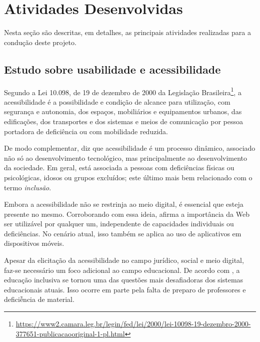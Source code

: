 \chapter{Atividades Desenvolvidas}\label{sec:ativ_desenvolvidas}
Nesta seção são descritas, em detalhes, as principais atividades realizadas para a condução deste projeto.


\section{Estudo sobre usabilidade e acessibilidade}\label{sec:estudos_usab_acess} 


Segundo a Lei 10.098, de 19 de dezembro de 2000 da Legislação Brasileira\footnote{\url{https://www2.camara.leg.br/legin/fed/lei/2000/lei-10098-19-dezembro-2000-377651-publicacaooriginal-1-pl.html}}, a acessibilidade é a possibilidade e condição de alcance para utilização, com segurança e autonomia, dos
espaços, mobiliários e equipamentos urbanos, das edificações, dos transportes e dos sistemas e meios de comunicação por pessoa portadora de deficiência ou com mobilidade reduzida. 

De modo complementar, \cite{torres2002acessibilidade} diz que acessibilidade é um processo dinâmico, associado não só ao desenvolvimento tecnológico, mas principalmente ao desenvolvimento da sociedade. Em geral, está associada a pessoas com deficiências físicas ou psicológicas, idosos ou grupos excluídos; este último mais bem relacionado com o termo \textit{inclusão}. 

Embora a acessibilidade não se restrinja ao meio digital, é essencial que esteja presente no mesmo. Corroborando com essa ideia, \cite{leew3c} afirma a importância da Web ser utilizável por qualquer um, independente de capacidades individuais ou deficiências. No cenário atual, isso também se aplica ao uso de aplicativos em dispositivos móveis.

Apesar da elicitação da acessibilidade no campo jurídico, social e meio digital, faz-se necessário um foco adicional ao campo educacional. De acordo com \cite{Bine2018DigitalIT}, a educação inclusiva se tornou uma das questões mais desafiadoras dos sistemas educacionais atuais. Isso ocorre em parte pela falta de preparo de professores e deficiễncia de material.

